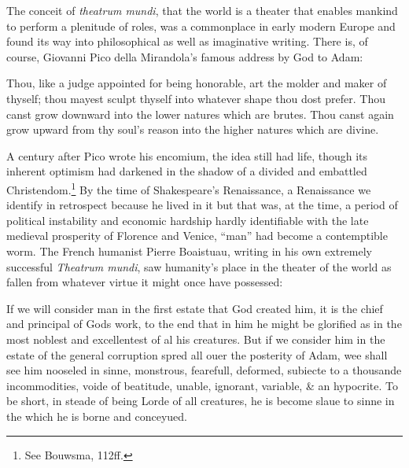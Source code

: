 The conceit of \emph{theatrum mundi}, that the world is a theater that enables mankind to perform a plenitude of roles, was a commonplace in early modern Europe and found its way into philosophical as well as imaginative writing. There is, of course, Giovanni Pico della Mirandola's famous address by God to Adam: \begin{bq}
Thou, like a judge appointed for being honorable, art the molder and maker of thyself; thou mayest sculpt thyself into whatever shape thou dost prefer. Thou canst grow downward into the lower natures which are brutes. Thou canst again grow upward from thy soul's reason into the higher natures which are divine.~\cite[5]{mirandola_dignity_1998}
\end{bq}
A century after Pico wrote his encomium, the idea still had life, though its inherent optimism had darkened in the shadow of a divided and embattled Christendom.\footnote{See Bouwsma, 112ff.\nocite{bouwsma_waning_2000}} By the time of Shakespeare's Renaissance, a Renaissance we identify in retrospect because he lived in it but that was, at the time, a period of political instability and economic hardship hardly identifiable with the late medieval prosperity of Florence and Venice, ``man'' had become a contemptible worm. The French humanist Pierre Boaistuau, writing in his own extremely successful \emph{Theatrum mundi}, saw humanity's place in the theater of the world as fallen from whatever virtue it might once have possessed:
\begin{bq}
If we will consider man in the first estate that God created him, it is the chief and principal of Gods work, to the end that in him he might be glorified as in the most noblest and excellentest of al his creatures. But if we consider him in the estate of the general corruption spred all ouer the posterity of Adam, wee shall see him nooseled in sinne, monstrous, fearefull, deformed, subiecte to a thousande incommodities, voide of beatitude, unable, ignorant, variable, \& an hypocrite. To be short, in steade of being Lorde of all creatures, he is become slaue to sinne in the which he is borne and conceyued.~\cite[285]{boaistuau_theatrum_1574}
\end{bq}
